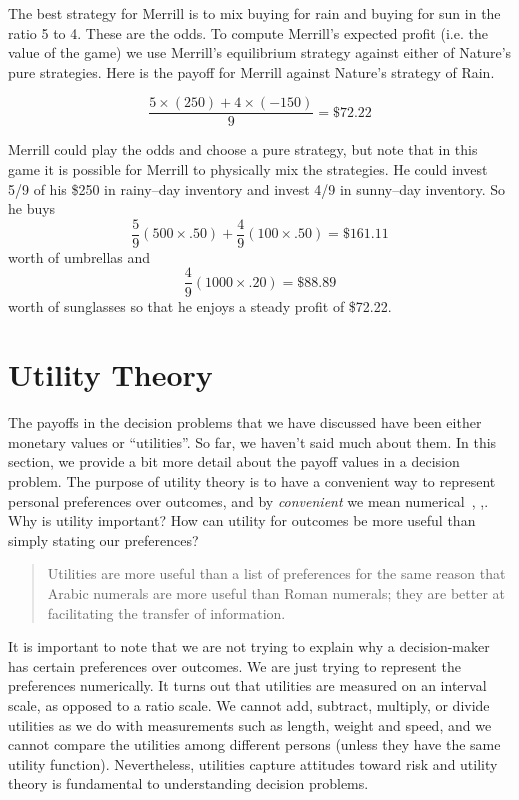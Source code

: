 The best strategy for Merrill is to mix buying for rain and buying
for sun in the ratio 5 to 4. These are the odds. To compute 
Merrill's expected profit (i.e. the value of the game) we use
Merrill's  equilibrium strategy against either of Nature's
pure strategies. Here is the payoff for Merrill against
Nature's strategy of Rain.

\[ \frac{5 \times (250) + 4 \times (-150)}{9} = \$72.22 \]

Merrill could play the odds and choose a pure strategy, but 
note that in this game it is possible for Merrill to physically
mix the strategies. He could invest 5/9 of his \$250 in
rainy--day inventory and invest 4/9 in sunny--day inventory.
So he buys
\[ \frac{5}{9} \left(500 \times .50\right) + \frac{4}{9} \left(100 \times .50\right) = \$161.11 \]
worth of umbrellas and
\[ \frac{4}{9} \left(1000 \times .20\right) = \$88.89 \]
worth of sunglasses so that he enjoys a steady profit of \$72.22.

\section{Utility Theory}
The payoffs in the decision problems that we have discussed have been
either monetary values or ``utilities''. So far, we haven't said much
about them.  In this section, we provide a bit more detail about the
payoff values in a decision problem.  The purpose of utility theory is
to have a convenient way to represent personal preferences over
outcomes, and by \emph{convenient} we mean numerical~\cite{luce:1957},
\cite{peterson:2009},\cite{resnik:1987}. Why is utility
important? How can utility for outcomes be more useful than simply
stating our preferences?

\begin{quote} %
Utilities are more
useful than a list of preferences for the same reason that Arabic
numerals are more useful than Roman numerals; they are better at
facilitating the transfer of information. 
\end{quote} 

It is important to note that we are not trying to explain why a
decision-maker has certain preferences over outcomes. We are just
trying to represent the preferences numerically. It turns out that
utilities are measured on an interval scale, as opposed to a ratio
scale. We cannot add, subtract, multiply, or divide utilities as we do
with measurements such as length, weight and speed, and we cannot
compare the utilities among different persons (unless they have the
same utility function).  Nevertheless, utilities capture attitudes
toward risk and utility theory is fundamental to understanding
decision problems.
\vspace{.2in} 


